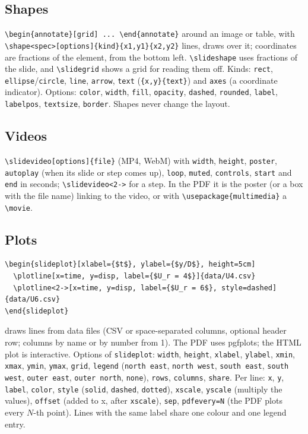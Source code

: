 \documentclass[a4paper,11pt]{article}
\newcommand\cs[1]{\texttt{\textbackslash #1}}
\newcommand\env[1]{\texttt{#1}}
\newcommand\opt[1]{\texttt{#1}}
\begin{document}
\subsection{Shapes}

\verb|\begin{annotate}[grid] ... \end{annotate}| around an image or table,
with \verb|\shape<spec>[options]{kind}{x1,y1}{x2,y2}| lines, draws over it;
coordinates are fractions of the element, from the bottom left.
\cs{slideshape} uses fractions of the slide, and \cs{slidegrid} shows a grid
for reading them off. Kinds: \opt{rect}, \opt{ellipse}/\opt{circle},
\opt{line}, \opt{arrow}, \opt{text} (\verb|{x,y}{text}|) and \opt{axes} (a
coordinate indicator). Options: \opt{color}, \opt{width}, \opt{fill},
\opt{opacity}, \opt{dashed}, \opt{rounded}, \opt{label}, \opt{labelpos},
\opt{textsize}, \opt{border}. Shapes never change the layout.

\subsection{Videos}

\verb|\slidevideo[options]{file}| (MP4, WebM) with \opt{width},
\opt{height}, \opt{poster}, \opt{autoplay} (when its slide or step comes
up), \opt{loop}, \opt{muted}, \opt{controls}, \opt{start} and \opt{end} in
seconds; \verb|\slidevideo<2->| for a step. In the PDF it is the poster (or
a box with the file name) linking to the video, or with
\verb|\usepackage{multimedia}| a \cs{movie}.

\subsection{Plots}

\begin{Verbatim}
\begin{slideplot}[xlabel={$t$}, ylabel={$y/D$}, height=5cm]
  \plotline[x=time, y=disp, label={$U_r = 4$}]{data/U4.csv}
  \plotline<2->[x=time, y=disp, label={$U_r = 6$}, style=dashed]{data/U6.csv}
\end{slideplot}
\end{Verbatim}
draws lines from data files (CSV or space-separated columns, optional header
row; columns by name or by number from 1). The PDF uses \textsf{pgfplots};
the HTML plot is interactive. Options of \env{slideplot}: \opt{width},
\opt{height}, \opt{xlabel}, \opt{ylabel}, \opt{xmin}, \opt{xmax},
\opt{ymin}, \opt{ymax}, \opt{grid}, \opt{legend} (\opt{north east},
\opt{north west}, \opt{south east}, \opt{south west}, \opt{outer east},
\opt{outer north}, \opt{none}), \opt{rows}, \opt{columns}, \opt{share}. Per
line: \opt{x}, \opt{y}, \opt{label}, \opt{color}, \opt{style}
(\opt{solid}, \opt{dashed}, \opt{dotted}), \opt{xscale}, \opt{yscale}
(multiply the values), \opt{offset} (added to x, after \opt{xscale}),
\opt{sep}, \opt{pdfevery=N} (the PDF plots every $N$-th point). Lines with
the same label share one colour and one legend entry.
\end{document}
